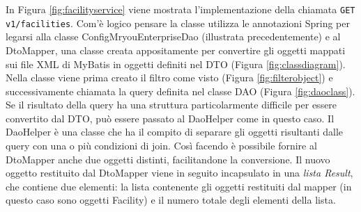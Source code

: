 In Figura \ref{fig:facilityservice} viene mostrata l'implementazione della chiamata \texttt{GET v1/facilities}. Com'è logico pensare la classe utilizza le annotazioni Spring per legarsi alla classe ConfigMryouEnterpriseDao (illustrata precedentemente) e al DtoMapper, una classe creata appositamente per convertire gli oggetti mappati sui file XML di MyBatis in oggetti definiti nel DTO (Figura \ref{fig:classdiagram}). Nella classe viene prima creato il filtro come visto (Figura \ref{fig:filterobject}) e successivamente chiamata la query definita nel classe DAO (Figura \ref{fig:daoclass}). Se il risultato della query ha una struttura particolarmente difficile per essere convertito dal DTO, può essere passato al DaoHelper come in questo caso. Il DaoHelper è una classe che ha il compito di separare gli oggetti risultanti dalle query con una o più condizioni di join. Così facendo è possibile fornire al DtoMapper anche due oggetti distinti, facilitandone la conversione. Il nuovo oggetto restituito dal DtoMapper viene in seguito incapsulato in una \emph{lista Result}, che contiene due elementi: la lista contenente gli oggetti restituiti dal mapper (in questo caso sono oggetti Facility) e il numero totale degli elementi della lista.
